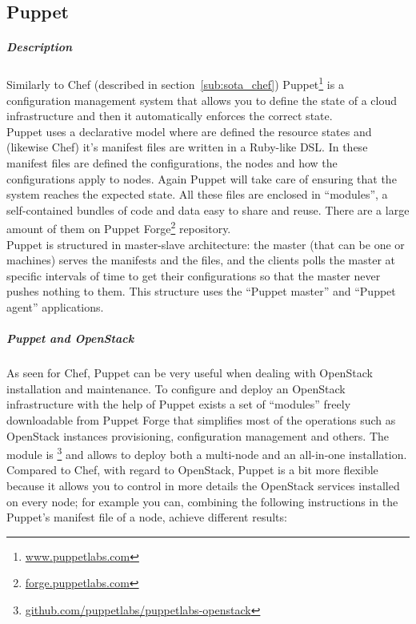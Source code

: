 

\subsection{Puppet}
\label{sub:sota_puppet}

\subparagraph{Description}
\label{subp:sota_puppet_desc}

Similarly to Chef (described in section~\ref{sub:sota_chef}) Puppet\footnote{\url{www.puppetlabs.com}} is a configuration management system that allows you to define the state of a cloud infrastructure and then it automatically enforces the correct state.\\
Puppet uses a declarative model where are defined the resource states and (likewise Chef) it's manifest files are written in a Ruby-like DSL. In these manifest files are defined the configurations, the nodes and how the configurations apply to nodes. Again Puppet will take care of ensuring that the system reaches the expected state. All these files are enclosed in ``modules'', a self-contained bundles of code and data easy to share and reuse. There are a large amount of them on Puppet Forge\footnote{\url{forge.puppetlabs.com}} repository.\\
Puppet is structured in master-slave architecture: the master (that can be one or machines) serves the manifests and the files, and the clients polls the master at specific intervals of time to get their configurations so that the master never pushes nothing to them. This structure uses the ``Puppet master'' and ``Puppet agent'' applications.


\subparagraph{Puppet and OpenStack}
\label{subp:sota_puppet_openstack}

As seen for Chef, Puppet can be very useful when dealing with OpenStack installation and maintenance. To configure and deploy an OpenStack infrastructure with the help of Puppet exists a set of ``modules'' freely downloadable from Puppet Forge that simplifies most of the operations such as OpenStack instances provisioning, configuration management and others.
The module is \footnote{\url{github.com/puppetlabs/puppetlabs-openstack}} and allows to deploy both a multi-node and an all-in-one installation. Compared to Chef, with regard to OpenStack, Puppet is a bit more flexible because it allows you to control in more details the OpenStack services installed on every node; for example you can, combining the following instructions in the Puppet's manifest file of a node, achieve different results:

